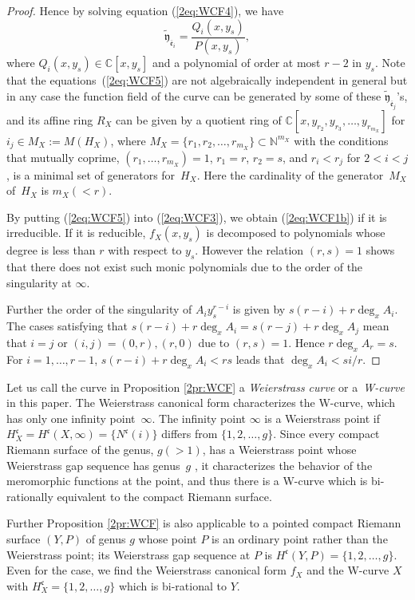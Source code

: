 \documentclass[10pt,a4paper]{amsart}
\def\CC{{\mathbb C}}
\def\NN{{\mathbb N}}
\def\fc{{\mathfrak c}}
\def\tfy{{\widetilde{\mathfrak y}}}
\def\Bfe{{\overline{\mathfrak e}}}
\numberwithin{equation}{section}
\begin{document}
\begin{proof}
Hence by solving equation (\ref{2eq:WCF4}), we have
\begin{equation}
\tfy_{\Bfe_i} = \frac{Q_{i}(x, y_s)}{P(x, y_s)},
\label{2eq:WCF5}
\end{equation}
where $Q_{i}(x, y_s) \in \CC[x,y_s]$ and a polynomial of order at most $r-2$ in $y_s$.
Note that the equations~(\ref{2eq:WCF5}) are not algebraically independent in general but in any case the function field of the curve can be generated by
some of these $\tfy_{\Bfe_j}$'s, and its affine ring $R_X$ can be given by a quotient ring of $\CC[x,y_{r_2}, y_{r_3}, \dots, y_{r_{m_X}}]$ for $i_j \in M_X:=M(H_X)$, where $M_X =\{ r_1, r_2, \dots, r_{m_X}\} \subset \NN^{{m_X}}$ with the conditions that mutually coprime, $(r_1, \dots, r_{m_X}) = 1$, $r_1=r$, $r_2=s$, and $r_i<r_j$ for $2<i<j$, is a minimal set of generators for~$H_X$. Here the cardinality of the generator~$M_X$ of~$H_X$ is $m_X (< r)$.

By putting (\ref{2eq:WCF5}) into (\ref{2eq:WCF3}), we obtain (\ref{2eq:WCF1b}) if it is irreducible.
If it is reducible, $f_X(x,y_s)$ is decomposed to polynomials whose degree is less than $r$ with respect to $y_s$. However the relation $(r,s)=1$ shows that there does not exist such monic polynomials due to the order of the singularity at $\infty$.

Further the order of the singularity of $A_i y_s^{r-i}$ is given by
$s(r-i)+r\deg_x A_i$.
The cases satisfying that $s(r-i)+r\deg_x A_i= s(r-j)+r\deg_x A_j$ mean that $i=j$ or $(i,j)=(0,r), (r,0)$ due to $(r,s)=1$. Hence $r\deg_x A_r = s$. For $i=1, \dots, r-1$, $s(r-i)+r\deg_x A_i<rs$ leads that $\deg_x A_i<s i/r$.
\end{proof}

\begin{Remark}\label{2rm:2.9}
Let us call the curve in Proposition \ref{2pr:WCF} a {\emph{Weierstrass curve}} or a~{\emph{W-curve}} in this paper.
The Weierstrass canonical form characterizes the W-curve, which has only one infinity point~$\infty$. The infinity point $\infty$ is a Weierstrass point if $H_X^\fc=H^\fc(X,\infty)=\{N^\fc(i)\}$ differs from $\{1, 2, \dots, g\}$.
Since every compact Riemann surface of the genus, $g(>1)$, has a Weierstrass point whose Weierstrass gap sequence has genus~$g$ \cite{ACGH85, FarkasKra}, it characterizes the behavior of the meromorphic functions at the point, and thus there is a W-curve which is bi-rationally equivalent to the compact Riemann surface.

Further Proposition \ref{2pr:WCF} is also applicable to a pointed compact Riemann surface $(Y, P)$ of genus $g$ whose point $P$ is an ordinary point rather than the Weierstrass point; its Weierstrass gap sequence at $P$ is $H^\fc(Y, P)=\{1, 2, \dots, g\}$.
Even for the case, we find the Weierstrass canonical form $f_X$ and the W-curve $X$ with $H_X^\fc=\{1, 2, \dots, g\}$ which is bi-rational to $Y$.
\end{Remark}
\end{document}
